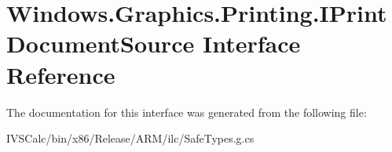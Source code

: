 \hypertarget{interface_windows_1_1_graphics_1_1_printing_1_1_i_print_document_source}{}\section{Windows.\+Graphics.\+Printing.\+I\+Print\+Document\+Source Interface Reference}
\label{interface_windows_1_1_graphics_1_1_printing_1_1_i_print_document_source}


The documentation for this interface was generated from the following file\+:\begin{DoxyCompactItemize}
\item 
I\+V\+S\+Calc/bin/x86/\+Release/\+A\+R\+M/ilc/Safe\+Types.\+g.\+cs\end{DoxyCompactItemize}
